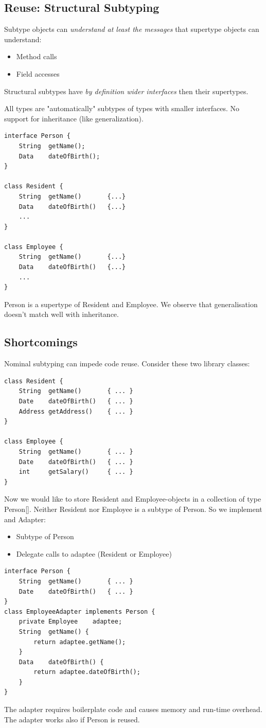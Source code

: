 \subsection{Reuse: Structural Subtyping}
Subtype objects can \emph{understand at least the messages} that supertype objects can understand:
\begin{itemize}
	\item Method calls
	\item Field accesses
\end{itemize}
Structural subtypes have \emph{by definition wider interfaces} then their supertypes.

All types are "automatically" subtypes of types with smaller interfaces. No support for inheritance (like generalization). 
\begin{lstlisting}[caption=Structural Subtyping Example]
interface Person {
	String 	getName();
	Data	dateOfBirth();
}

class Resident {
	String 	getName()		{...}
	Data	dateOfBirth()	{...}
	...
}	

class Employee {
	String 	getName()		{...}
	Data	dateOfBirth()	{...}
	...
}

\end{lstlisting}
Person is a supertype of Resident and Employee. We observe that generalisation doesn't match well with inheritance.



\subsection{Shortcomings}
Nominal subtyping can impede code reuse. Consider these two library classes:
\begin{lstlisting}
class Resident {
	String	getName()		{ ... }
	Date	dateOfBirth()	{ ... }
	Address	getAddress()	{ ... }
}

class Employee {
	String	getName()		{ ... }
	Date	dateOfBirth()	{ ... }
	int		getSalary()		{ ... }
}
\end{lstlisting}
Now we would like to store Resident and Employee-objects in a collection of type Person[]. Neither Resident nor Employee is a subtype of Person. So we implement and Adapter:
\begin{itemize}
	\item Subtype of Person
	\item Delegate calls to adaptee (Resident or Employee)
\end{itemize}
\begin{lstlisting}
interface Person {
	String	getName()		{ ... }
	Date	dateOfBirth()	{ ... }
}
class EmployeeAdapter implements Person {
	private	Employee	adaptee;
	String 	getName() {
		return adaptee.getName(); 
	} 
	Data 	dateOfBirth() { 
		return adaptee.dateOfBirth(); 
	}
}
\end{lstlisting}
The adapter requires boilerplate code and causes memory and run-time overhead. The adapter works also if Person is reused.



